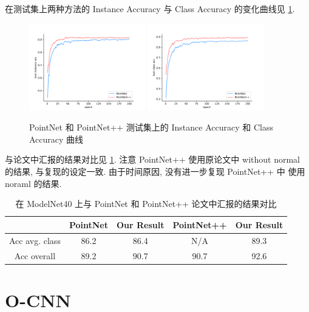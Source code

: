 \documentclass[11pt]{article}
\newcommand\1{\mathds{1}}
\begin{document}
在测试集上两种方法的 Instance Accuracy 与 Class Accuracy 的变化曲线见 \cref{fig:pointnet_test_acc}.
\begin{figure}[htbp]
    \centering
    \includegraphics[width = 0.45\textwidth]{./logs/figures/pointnet_test_ins_acc.pdf}
    \includegraphics[width = 0.45\textwidth]{./logs/figures/pointnet_test_class_acc.pdf}
    \caption{PointNet 和 PointNet++ 测试集上的 Instance Accuracy 和 Class Accuracy 曲线}
    \label{fig:pointnet_test_acc}
\end{figure}   
与论文中汇报的结果对比见 \cref{tab:pointnet_result}. 注意 PointNet++ 使用原论文中 without normal 的结果, 
与复现的设定一致. 由于时间原因, 没有进一步复现 PointNet++ 中 使用 noraml 的结果.

\begin{table}[htbp]
    \centering
    \begin{tabular}{ccccc}
    \toprule
    & \textbf{PointNet} & \textbf{Our Result} & \textbf{PointNet++}  & \textbf{Our Result} \\
    \midrule
    Acc avg. class & 86.2 & 86.4 & N/A &  89.3\\
    Acc overall & 89.2 & 90.7 & 90.7 & 92.6\\
    \bottomrule
\end{tabular}
    \caption{在 ModelNet40 上与 PointNet 和 PointNet++ 论文中汇报的结果对比}
    \label{tab:pointnet_result}
\end{table}


\section{O-CNN}
\end{document}

